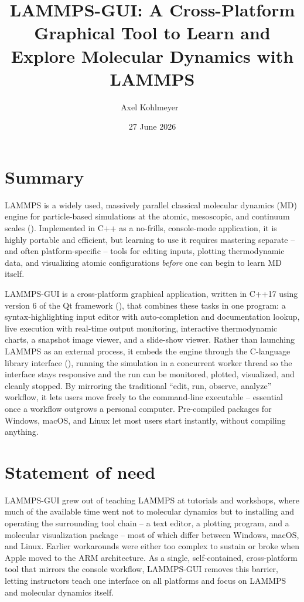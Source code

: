 \documentclass[
]{article}
\title{LAMMPS-GUI: A Cross-Platform Graphical Tool to Learn and Explore
Molecular Dynamics with LAMMPS}
\author[1%
  \ensuremath\mathparagraph]{Axel Kohlmeyer%
    \,\orcidlink{0000-0001-6204-6475}\,%
    }
\affil[1]{Institute for Computational Molecular Science, Temple
University, Philadelphia, PA, USA%
  }
\affil[$\mathparagraph$]{Corresponding author: %
}
\date{27 June 2026}
\begin{document}
\maketitle

\section{Summary}\label{summary}

LAMMPS is a widely used, massively parallel classical molecular dynamics
(MD) engine for particle-based simulations at the atomic, mesoscopic,
and continuum scales (). Implemented in C++ as a no-frills, console-mode application, it
is highly portable and efficient, but learning to use it requires
mastering separate -- and often platform-specific -- tools for editing
inputs, plotting thermodynamic data, and visualizing atomic
configurations \emph{before} one can begin to learn MD itself.

LAMMPS-GUI is a cross-platform graphical application, written in C++17
using version 6 of the Qt framework (), that combines these tasks in one program: a
syntax-highlighting input editor with auto-completion and documentation
lookup, live execution with real-time output monitoring, interactive
thermodynamic charts, a snapshot image viewer, and a slide-show viewer.
Rather than launching LAMMPS as an external process, it embeds the
engine through the C-language library interface
(), running
the simulation in a concurrent worker thread so the interface stays
responsive and the run can be monitored, plotted, visualized, and
cleanly stopped. By mirroring the traditional ``edit, run, observe,
analyze'' workflow, it lets users move freely to the command-line
executable -- essential once a workflow outgrows a personal computer.
Pre-compiled packages for Windows, macOS, and Linux let most users start
instantly, without compiling anything.

\section{Statement of need}\label{statement-of-need}

LAMMPS-GUI grew out of teaching LAMMPS at tutorials and workshops, where
much of the available time went not to molecular dynamics but to
installing and operating the surrounding tool chain -- a text editor, a
plotting program, and a molecular visualization package -- most of which
differ between Windows, macOS, and Linux. Earlier workarounds were
either too complex to sustain or broke when Apple moved to the ARM
architecture. As a single, self-contained, cross-platform tool that
mirrors the console workflow, LAMMPS-GUI removes this barrier, letting
instructors teach one interface on all platforms and focus on LAMMPS and
molecular dynamics itself.
\end{document}
